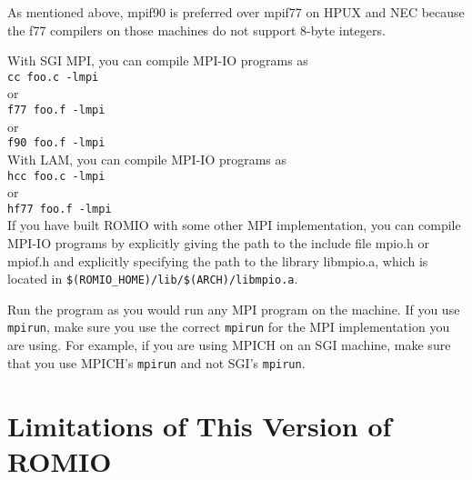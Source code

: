 As mentioned above, mpif90 is preferred over mpif77 on HPUX and NEC
because the f77 compilers on those machines do not support 8-byte integers.

With SGI MPI, you can compile MPI-IO programs as \\
\hspace*{.4in} {\tt cc foo.c -lmpi}\\
or \\
\hspace*{.4in} {\tt f77 foo.f -lmpi}\\
or \\
\hspace*{.4in} {\tt f90 foo.f -lmpi}\\

With LAM, you can compile MPI-IO programs as \\
\hspace*{.4in} {\tt hcc foo.c -lmpi}\\
or \\
\hspace*{.4in} {\tt hf77 foo.f -lmpi}\\

If you have built ROMIO with some other MPI implementation, you can
compile MPI-IO programs by explicitly giving the path to the include
file mpio.h or mpiof.h and explicitly specifying the path to the
library libmpio.a, which is located in {\tt \$(ROMIO\_HOME)/lib/\$(ARCH)/libmpio.a}.

Run the program as you would run any MPI program on the machine.
If you use {\tt mpirun}, make sure you use the correct {\tt mpirun}
for the MPI implementation you are using. For example, if you
are using MPICH on an SGI machine, make sure that you use MPICH's
{\tt mpirun} and not SGI's {\tt mpirun}.


%
%
\section{Limitations of This Version of ROMIO \label{sec:limit}}

